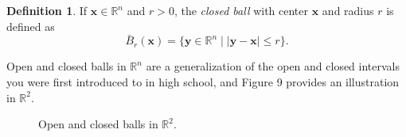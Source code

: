 \documentclass{article}
\newcommand{\R}{\mathbb{R}}
\newcommand{\x}{\mathbf{x}}
\newcommand{\y}{\mathbf{y}}
\theoremstyle{definition}
\newtheorem{definition}{Definition}[section]
\begin{document}
	\begin{definition}\label{def2.4}
		If $ \x\in\R^n $ and $ r>0 $, the \textit{\color{red} closed ball} with center $ \x $ and radius $ r $ is defined as $$ \bar{B}_r(\x)=\{\y\in\R^n\mid|\y-\x|\le r\}. $$ 
	\end{definition}
	Open and closed balls in $ \R^n $ are a generalization of the open and closed intervals you were first introduced to in high school, and Figure 9 provides an illustration in $ \R^2 $. 
	\begin{figure}[h!]
		\centering
		\caption{Open and closed balls in $ \R^2 $.}
	\end{figure}  
\end{document}
